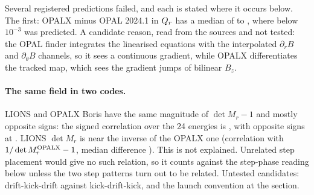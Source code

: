 \begin{table}[h]
\centering\small
\caption{Case G3: OPALX against FIXPO, median / maximum over the energies of \cref{tab:G2}, Jacobian tunes, 1440 steps.
$|\operatorname{tr}M_r/2|>1$ at several energies, where the tune is clipped to 0.5; the maxima include these.}
\label{tab:G3}

\end{table}

\begin{table}[h]
\centering\small
\caption{Case G3: OPALX $\det M_r - 1$ against steps per turn.}
\label{tab:G3det}

\end{table}

Several registered predictions failed, and each is stated where it occurs below.
The first: OPALX minus OPAL 2024.1 in $Q_r$ has a median of \GThreeOpalQrMin{} to \GThreeOpalQrMax{}, where below $10^{-3}$ was predicted.
A candidate reason, read from the sources and not tested: the OPAL finder integrates the linearised equations with the interpolated $\partial_rB$ and $\partial_\theta B$ channels, so it sees a continuous gradient, while OPALX differentiates the tracked map, which sees the gradient jumps of bilinear $B_z$.

\paragraph{The same field in two codes.}
LIONS and OPALX Boris have the same magnitude of $\det M_r-1$ and mostly opposite signs: the signed correlation over the 24 energies is \GThreeSignedCorr, with opposite signs at \GThreeOppSign.
LIONS $\det M_r$ is near the inverse of the OPALX one (correlation \GThreeInvCorr{} with $1/\det M_r^{\rm OPALX}-1$, median difference \GThreeInvMed).
This is not explained.
Unrelated step placement would give no such relation, so it counts against the step-phase reading below unless the two step patterns turn out to be related.
Untested candidates: drift-kick-drift against kick-drift-kick, and the launch convention at the section.

